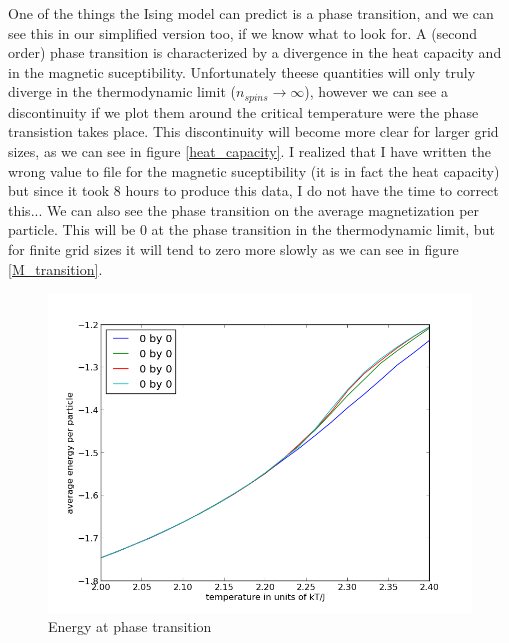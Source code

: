 \documentclass[a4paper,english, 10pt, twoside]{article}
\begin{document}
One of the things the Ising model can predict is a phase transition, and we can see this in our simplified version too, if we 
know what to look for. A (second order) phase transition is characterized by a divergence in the heat capacity and in the 
magnetic suceptibility. Unfortunately theese quantities will only truly diverge in the thermodynamic limit ($n_{spins}
\to \infty$), however we can see a discontinuity if we plot them around the critical temperature were the phase transistion 
takes place. This discontinuity will become more clear for larger grid sizes, as we can see in figure \ref{heat_capacity}. I 
realized that I have written the wrong value to file for the magnetic suceptibility (it is in fact the heat capacity) but since 
it took 8 hours to produce this data, I do not have the time to correct this... We can also see the phase transition on the 
average magnetization per particle. This will be 0 at the phase transition in the thermodynamic limit, but for finite grid sizes 
it will tend to zero more slowly as we can see in figure \ref{M_transition}.
\begin{figure}[H]
  \centering
 \includegraphics[scale=0.5]{energy.png}
 \caption{Energy at phase transition}
\label{E_transition}
 \end{figure} 
 
\end{document}
